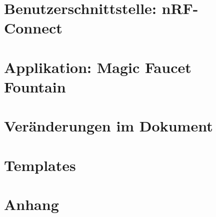 \documentclass[10pt,a4paper,bibliography=totoc]{scrbook}
\begin{document}
{\part{Benutzerschnittstelle: nRF-Connect}
\label{part:Teil4}
	
  
  
\part{Applikation: Magic Faucet Fountain}
\label{part:Teil5}
  
  
  


\part{Veränderungen im Dokument}
\label{part:Teil6}
	
	

\Ausblenden
{
\part{Templates}
}

{
\part{Anhang}
\label{part:Teil7}
	

	
}


\Ausblenden
{
  
  
}




}
\end{document}
